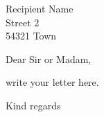 \documentclass[a4paper,fromalign=right,fromphone,fromemail,subject=titled]{scrlttr2}
\begin{document}
\begin{letter}{Recipient Name\\Street 2\\54321 Town}
  \opening{Dear Sir or Madam,}

  write your letter here.

  \closing{Kind regards}
\end{letter}
\end{document}
